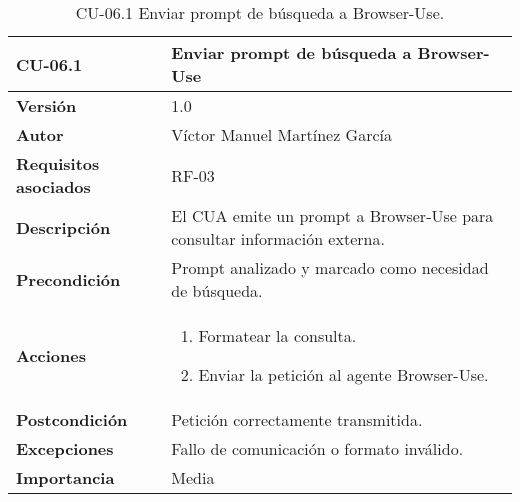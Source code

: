 \begin{table}[p]
    \centering
    \begin{tabularx}{\linewidth}{ p{} p{} }
        \toprule
        \textbf{CU-06.1}    & \textbf{Enviar prompt de búsqueda a Browser-Use}\\
        \toprule
        \textbf{Versión}              & 1.0 \\
        \textbf{Autor}                & Víctor Manuel Martínez García \\
        \textbf{Requisitos asociados} & RF-03 \\
        \textbf{Descripción}          & El CUA emite un prompt a Browser-Use para consultar información externa.\\
        \textbf{Precondición}         & Prompt analizado y marcado como necesidad de búsqueda.\\
        \textbf{Acciones}             &
        \begin{enumerate}
          \item Formatear la consulta.
          \item Enviar la petición al agente Browser-Use.
        \end{enumerate}\\
        \textbf{Postcondición}        & Petición correctamente transmitida.\\
        \textbf{Excepciones}          & Fallo de comunicación o formato inválido.\\
        \textbf{Importancia}          & Media \\
        \bottomrule
    \end{tabularx}
    \caption{CU-06.1 Enviar prompt de búsqueda a Browser-Use.}
    \label{CU-06.1 Enviar prompt de busqueda a Browser-Use}
\end{table}

